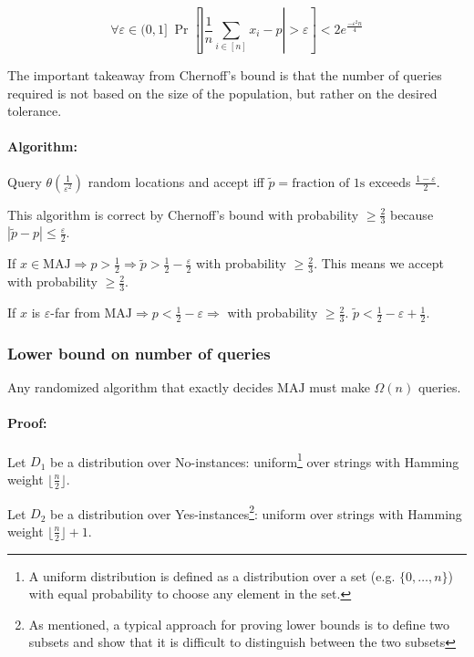 \documentclass{idc_msc}
\begin{document}
\[
  \forall \varepsilon \in (0, 1] \; \Pr\left[\left|\frac{1}{n} \sum_{i \in [n]} x_i - p \right| > \varepsilon \right] < 2e^{\frac{-\varepsilon^2 n}{4}}
\]

The important takeaway from Chernoff's bound is that the number of queries required is not based on the size of the population, but rather on the desired tolerance.

\paragraph{Algorithm:}

Query \(\theta(\frac{1}{\varepsilon^2})\) random locations and accept iff \(\tilde{p} = \textrm{fraction of 1s}\) exceeds \(\frac{1-\varepsilon}{2}\).

This algorithm is correct by Chernoff's bound with probability \(\ge \frac{2}{3}\) because \(|\tilde{p} - p| \le \frac{\varepsilon}{2}\).

If \(x \in \mathrm{MAJ} \Rightarrow p > \frac{1}{2} \Rightarrow \tilde{p} > \frac{1}{2} - \frac{\varepsilon}{2}\) with probability \(\ge \frac{2}{3}\).
This means we accept with probability \(\ge \frac{2}{3}\).

If \(x\) is \(\varepsilon\)-far from \(\mathrm{MAJ} \Rightarrow p < \frac{1}{2} - \varepsilon \Rightarrow \) with probability \(\ge \frac{2}{3}\).
\(\tilde{p} < \frac{1}{2} - \varepsilon + \frac{1}{2}\).

\subsubsection{Lower bound on number of queries}

Any randomized algorithm that exactly decides \(\mathrm{MAJ}\) must make \(\Omega(n)\) queries.

\paragraph{Proof:}

Let \(D_1\) be a distribution over No-instances: uniform\footnote{A uniform distribution is defined as a distribution over a set (e.g. \(\{0,\ldots,n\}\)) with equal probability to choose any element in the set.} over strings with Hamming weight \(\lfloor \frac{n}{2} \rfloor\).

Let \(D_2\) be a distribution over Yes-instances\footnote{As mentioned, a typical approach for proving lower bounds is to define two subsets and show that it is difficult to distinguish between the two subsets}: uniform over strings with Hamming weight \(\lfloor \frac{n}{2} \rfloor + 1\).
\end{document}
